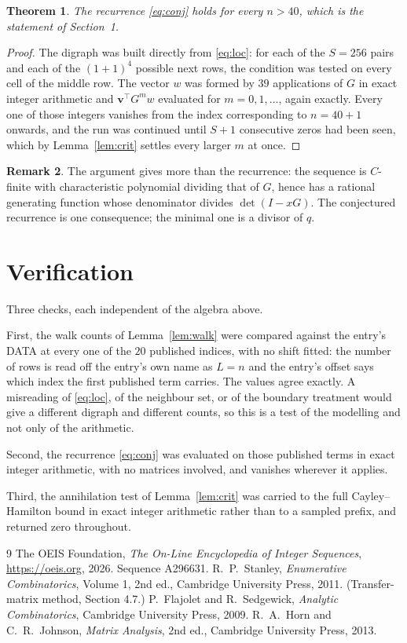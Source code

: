 \documentclass[11pt,a4paper]{article}
\theoremstyle{plain}
\newtheorem{theorem}{Theorem}
\theoremstyle{definition}
\newtheorem{remark}[theorem]{Remark}
\begin{document}
\begin{theorem}
The recurrence \eqref{eq:conj} holds for every $n>40$, which is the statement of
Section~1.
\end{theorem}

\begin{proof}
The digraph was built directly from \eqref{eq:loc}: for each of the $S=256$ pairs and each
of the $(1+1)^{4}$ possible next rows, the condition was tested on every cell of
the middle row. The vector $w$ was formed by $39$ applications of $G$ in exact integer
arithmetic and $\mathbf{v}^{\!\top}G^{m}w$ evaluated for $m=0,1,\dots$, again exactly.
Every one of those integers vanishes from the index corresponding to $n=40+1$ onwards,
and the run was continued until $S+1$ consecutive zeros had been seen, which by
Lemma~\ref{lem:crit} settles every larger $m$ at once.
\end{proof}

\begin{remark}
The argument gives more than the recurrence: the sequence is $C$-finite with characteristic
polynomial dividing that of $G$, hence has a rational generating function whose denominator
divides $\det(I-xG)$. The conjectured recurrence is one consequence; the minimal one is a
divisor of $q$.
\end{remark}

\section{Verification}

Three checks, each independent of the algebra above.

First, the walk counts of Lemma~\ref{lem:walk} were compared against the entry's DATA at
every one of the $20$ published indices, with no shift fitted: the number of rows is
read off the entry's own name as $L=n$ and the entry's offset says which index the first
published term carries. The values agree exactly. A misreading of \eqref{eq:loc}, of the
neighbour set, or of the boundary treatment would give a different digraph and different
counts, so this is a test of the modelling and not only of the arithmetic.

Second, the recurrence \eqref{eq:conj} was evaluated on those published terms in exact
integer arithmetic, with no matrices involved, and vanishes wherever it applies.

Third, the annihilation test of Lemma~\ref{lem:crit} was carried to the full
Cayley--Hamilton bound in exact integer arithmetic rather than to a sampled prefix, and
returned zero throughout.

\begin{thebibliography}{9}
 The OEIS Foundation, \emph{The On-Line Encyclopedia of Integer
Sequences}, \url{https://oeis.org}, 2026. Sequence A296631.
 R.~P.~Stanley, \emph{Enumerative Combinatorics}, Volume 1, 2nd ed.,
Cambridge University Press, 2011. (Transfer-matrix method, Section 4.7.)
 P.~Flajolet and R.~Sedgewick, \emph{Analytic Combinatorics}, Cambridge
University Press, 2009.
 R.~A.~Horn and C.~R.~Johnson, \emph{Matrix Analysis}, 2nd ed., Cambridge
University Press, 2013.
\end{thebibliography}
\end{document}
